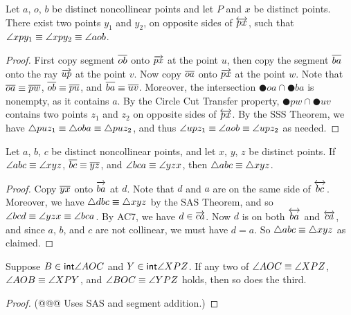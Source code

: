 \begin{construct}
Let \(a\), \(o\), \(b\) be distinct noncollinear points and let \(P\) and \(x\) be distinct points.
There exist two points \(y_1\) and \(y_2\), on opposite sides of \(\overleftrightarrow{px}\), such that \(\angle{xpy_1} \equiv \angle{xpy_2} \equiv \angle{aob}\). 
\end{construct}

\begin{proof}
First copy segment \(\overline{ob}\) onto \(\overrightarrow{px}\) at the point \(u\), then copy the segment \(\overline{ba}\) onto the ray \(\overrightarrow{up}\) at the point \(v\).
Now copy \(\overline{oa}\) onto \(\overrightarrow{px}\) at the point \(w\).
Note that \(\overline{oa} \equiv \overline{pw}\), \(\overline{ob} \equiv \overline{pu}\), and \(\overline{ba} \equiv \overline{uv}\).
Moreover, the intersection \(\CIRCLE{o}{a} \cap \CIRCLE{b}{a}\) is nonempty, as it contains \(a\).
By the Circle Cut Transfer property, \(\CIRCLE{p}{w} \cap \CIRCLE{u}{v}\) contains two points \(z_1\) and \(z_2\) on opposite sides of \(\overleftrightarrow{px}\).
By the SSS Theorem, we have \(\bigtriangleup{puz_1} \equiv \bigtriangleup{oba} \equiv \bigtriangleup{puz_2}\), and thus \(\angle{upz_1} \equiv \angle{aob} \equiv \angle{upz_2}\) as needed.
\end{proof}

\begin{prop}
Let \(a\), \(b\), \(c\) be distinct noncollinear points, and let \(x\), \(y\), \(z\) be distinct points.
If \(\angle{abc} \equiv \angle{xyz}\), \(\overline{bc} \equiv \overline{yz}\), and \(\angle{bca} \equiv \angle{yzx}\), then \(\bigtriangleup{abc} \equiv \bigtriangleup{xyz}\).
\end{prop}

\begin{proof}
Copy \(\overline{yx}\) onto \(\overrightarrow{ba}\) at \(d\).
Note that \(d\) and \(a\) are on the same side of \(\overleftrightarrow{bc}\).
Moreover, we have \(\bigtriangleup{dbc} \equiv \bigtriangleup{xyz}\) by the SAS Theorem, and so \(\angle{bcd} \equiv \angle{yzx} \equiv \angle{bca}\).
By AC7, we have \(d \in \overrightarrow{ca}\).
Now \(d\) is on both \(\overleftrightarrow{ba}\) and \(\overleftrightarrow{ca}\), and since \(a\), \(b\), and \(c\) are not collinear, we must have \(d = a\).
So \(\bigtriangleup{abc} \equiv \bigtriangleup{xyz}\) as claimed.
\end{proof}

\begin{prop}
Suppose \(B \in \mathsf{int}\angle{AOC}\) and \(Y \in \mathsf{int}\angle{XPZ}\).
If any two of \(\angle{AOC} \equiv \angle{XPZ}\), \(\angle{AOB} \equiv \angle{XPY}\), and \(\angle{BOC} \equiv \angle{YPZ}\) holds, then so does the third.
\end{prop}

\begin{proof}
(@@@ Uses SAS and segment addition.)
\end{proof}
